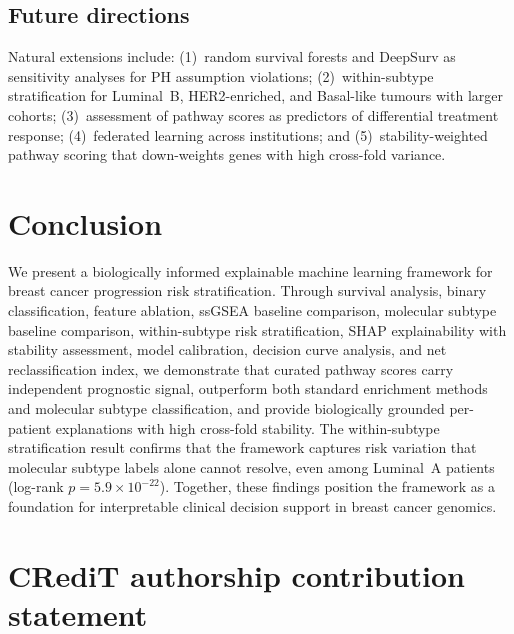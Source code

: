 \documentclass[review,12pt]{elsarticle}
\begin{document}
\subsection{Future directions}
\label{sec:disc_future}

Natural extensions include: (1)~random survival forests and DeepSurv as
sensitivity analyses for PH assumption violations; (2)~within-subtype
stratification for Luminal~B, HER2-enriched, and Basal-like tumours with
larger cohorts; (3)~assessment of pathway scores as predictors of
differential treatment response; (4)~federated learning across
institutions; and (5)~stability-weighted pathway scoring that
down-weights genes with high cross-fold variance.

\section{Conclusion}
\label{sec:conclusion}

We present a biologically informed explainable machine learning framework
for breast cancer progression risk stratification.  Through survival
analysis, binary classification, feature ablation, ssGSEA baseline
comparison, molecular subtype baseline comparison, within-subtype risk
stratification, SHAP explainability with stability assessment, model
calibration, decision curve analysis, and net reclassification index,
we demonstrate that curated pathway scores carry independent prognostic
signal, outperform both standard enrichment methods and molecular subtype
classification, and provide biologically grounded per-patient explanations
with high cross-fold stability.  The within-subtype stratification result
confirms that the framework captures risk variation that molecular subtype
labels alone cannot resolve, even among Luminal~A patients
(log-rank $p = 5.9 \times 10^{-22}$).  Together, these findings position
the framework as a foundation for interpretable clinical decision support
in breast cancer genomics.


\section*{CRediT authorship contribution statement}
\end{document}
